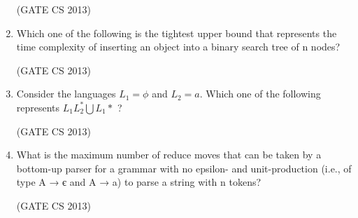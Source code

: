 \documentclass[a4paper, 11pt]{article}
\begin{document}
\begin{enumerate}
    \hfill (GATE CS 2013)
    
    \item Which one of the following is the tightest upper bound that represents the time complexity of inserting an object into a binary search tree of n nodes? 
    \begin{enumerate}
    \end{enumerate}
    
    \hfill (GATE CS 2013)
    
    \item  Consider the languages $L_1 =\phi $ and $ L_2 ={a }.$ Which one of the following represents $L_1L_2^*\bigcup L_1* $ ? 
    \begin{enumerate}
    \end{enumerate}
    \hfill (GATE CS 2013)
    \item What is the maximum number of reduce moves that can be taken by a bottom-up parser for a grammar with no epsilon- and unit-production (i.e., of type A → є and A → a) to parse a string with n tokens? 
    \begin{enumerate}
    \end{enumerate}

    \hfill (GATE CS 2013)
    

\end{enumerate}
\end{document}
